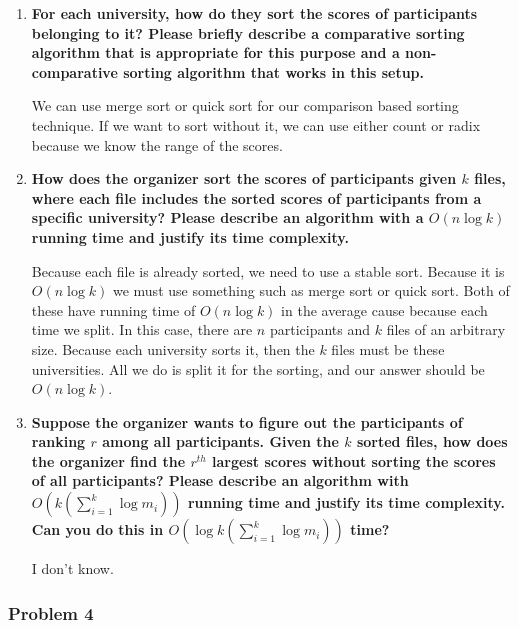 \documentclass[11pt]{article}
\begin{document}
\begin{enumerate}

\item \textbf{For each university, how do they sort the scores of participants
  belonging to it? Please briefly describe a comparative sorting
  algorithm that is appropriate for this purpose and a non-comparative
  sorting algorithm that works in this setup.}

 We can use merge sort or quick sort for our comparison based sorting technique. If we want to sort without it, we can use either count or radix because we know the range of the scores.

\item \textbf{How does the organizer sort the scores of participants given $k$
  files, where each file includes the sorted scores of participants
  from a specific university?  Please describe an algorithm with a
  $O(n\log k)$ running time and justify its time complexity.}

  Because each file is already sorted, we need to use a stable sort. Because it is $O(n\log k)$ we must use something such as merge sort or quick sort. Both of these have running time of $O(n \log k)$ in the average cause because each time we split. In this case, there are $n$ participants and $k$ files of an arbitrary size. Because each university sorts it, then the $k$ files must be these universities. All we do is split it for the sorting, and our answer should be $O(n \log k)$.

\item \textbf{Suppose the organizer wants to figure out the participants of
  ranking $r$ among all participants. Given the $k$ sorted files, how
  does the organizer find the $r^{th}$ largest scores without sorting
  the scores of all participants?  Please describe an algorithm with
  $O(k (\sum_{i=1}^{k}\log m_{i}) )$ running time and justify its time
  complexity. Can you do this in $O(\log k(\sum_{i=1}^{k}\log m_{i}))$ time?}

I don't know.

\end{enumerate}

\subsubsection*{Problem 4} 
\end{document}
